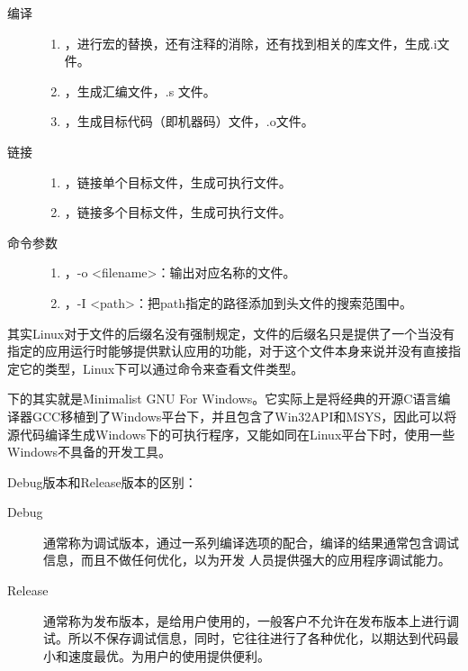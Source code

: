 \begin{description}
\item[编译]
\item[]
\begin{enumerate}
\item {}，进行宏的替换，还有注释的消除，还有找到相关的库文件，生成.i文件。
\item {}，生成汇编文件，.s 文件。
\item {}，生成目标代码（即机器码）文件，.o文件。
\end{enumerate}
\item[链接]
\item[]
\begin{enumerate}
\item {}，链接单个目标文件，生成可执行文件。
\item {}，链接多个目标文件，生成可执行文件。
\end{enumerate}
\item[命令参数]
\item[]
\begin{enumerate}
\item {}，-o <filename>：输出对应名称的文件。
\item {}，-I <path>：把path指定的路径添加到头文件的搜索范围中。
\end{enumerate}
\end{description}

其实Linux对于文件的后缀名没有强制规定，文件的后缀名只是提供了一个当没有指定的应用运行时能够提供默认应用的功能，对于这个文件本身来说并没有直接指定它的类型，Linux下可以通过命令来查看文件类型。\dpar

下的\thinspace\href{http://www.mingw.org/}{}\thinspace 其实就是Minimalist GNU For Windows。它实际上是将经典的开源C语言编译器GCC移植到了Windows平台下，并且包含了Win32API和MSYS，因此可以将源代码编译生成Windows下的可执行程序，又能如同在Linux平台下时，使用一些Windows不具备的开发工具。\dpar

Debug版本和Release版本的区别：

\begin{description}
\item[Debug] 通常称为调试版本，通过一系列编译选项的配合，编译的结果通常包含调试信息，而且不做任何优化，以为开发 人员提供强大的应用程序调试能力。
\item[Release] 通常称为发布版本，是给用户使用的，一般客户不允许在发布版本上进行调试。所以不保存调试信息，同时，它往往进行了各种优化，以期达到代码最小和速度最优。为用户的使用提供便利。
\end{description}
